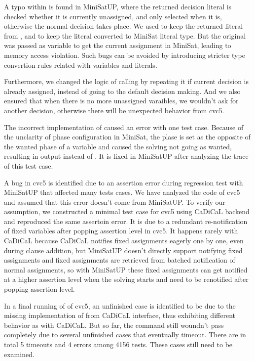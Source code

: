 A typo within  is found in MiniSatUP, where the returned decision literal is checked whether it is currently unassigned, and only selected when it is, otherwise the normal decision takes place. We used  to keep the returned literal from , and  to keep the literal converted to MiniSat literal type. But the original  was passed as variable to get the current assignment in MiniSat, leading to memory access violation. Such bugs can be avoided by introducing stricter type convertion rules related with variables and literals.

Furthermore, we changed the logic of calling  by repeating it if current decision is already assigned, instead of going to the default decision making. And we also ensured that when there is no more unassigned varaibles, we wouldn't ask for another decision, otherwise there will be unexpected behavior from cvc5.

The incorrect implementation of  caused an error with one test case. Because of the unclarity of phase configuration in MiniSat, the plase is set as the opposite of the wanted phase of a variable and caused the solving not going as wanted, resulting in  output instead of . It is fixed in MiniSatUP after analyzing the trace of this test case.

A bug in cvc5 is identified due to an assertion error during regression test with MiniSatUP that affected many tests cases. We have analyzed the code of cvc5 and assumed that this error doesn't come from MiniSatUP. To verify our assumption, we constructed a minimal test case for cvc5 using CaDiCaL backend and reproduced the same assertoin error. It is due to a redundant re-notification of fixed variables after popping assertion level in cvc5. It happens rarely with CaDiCaL because CaDiCaL notifies fixed assignments eagerly one by one, even during clause addition, but MiniSatUP doesn't directly support notifying fixed assignments and fixed assignments are retrieved from batched notification of normal assignments, so with MiniSatUP these fixed assignments can get notified at a higher assertion level when the solving starts and need to be renotified after popping assertion level.

In a final running of  of cvc5, an unfinished case is identified to be due to the missing implementation of  from CaDiCaL interface, thus exhibiting different behavior as with CaDiCaL. But so far, the  command still woundn't pass completely due to several unfinished cases that eventually timeout. There are in total 5 timeouts and 4 errors among 4156 tests. These cases still need to be examined.

